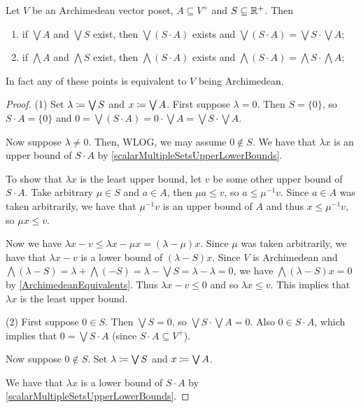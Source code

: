 \begin{lemma} \label{extremaScalarProduct}
Let $V$ be an Archimedean vector poset, $A\subseteq V^+$ and $S\subseteq \mathbb{R}^+$. Then
\begin{enumerate}
\item if $\bigvee A$ and $\bigvee S$ exist, then $\bigvee(S\cdot A)$ exists and $\bigvee(S\cdot A) = \bigvee S\cdot \bigvee A$;
\item if $\bigwedge A$ and $\bigwedge S$ exist, then $\bigwedge(S\cdot A)$ exists and $\bigwedge(S\cdot A) = \bigwedge S\cdot \bigwedge A$;
\end{enumerate}
\end{lemma}
In fact any of these points is equivalent to $V$ being Archimedean.
\begin{proof}
(1) Set $\lambda \coloneqq \bigvee S$ and $x \coloneqq \bigvee A$. First suppose $\lambda = 0$. Then $S = \{0\}$, so $S\cdot A = \{0\}$ and $0 = \bigvee(S\cdot A) = 0\cdot \bigvee A = \bigvee S \cdot \bigvee A$.

Now suppose $\lambda \neq 0$. Then, WLOG, we may assume $0\notin S$. We have that $\lambda x$ is an upper bound of $S\cdot A$ by \ref{scalarMultipleSetsUpperLowerBounds}.

To show that $\lambda x$ is the least upper bound, let $v$ be some other upper bound of $S\cdot A$. Take arbitrary $\mu\in S$ and $a\in A$, then $\mu a \leq v$, so $a \leq \mu^{-1}v$. Since $a\in A$ was taken arbitrarily, we have that $\mu^{-1}v$ is an upper bound of $A$ and thus $x \leq \mu^{-1}v$, so $\mu x\leq v$.

Now we have $\lambda x - v \leq \lambda x - \mu x = (\lambda - \mu) x$. Since $\mu$ was taken arbitrarily, we have that $\lambda x - v$ is a lower bound of $(\lambda - S)x$. Since $V$ is Archimedean and $\bigwedge (\lambda - S) = \lambda + \bigwedge (-S) = \lambda - \bigvee S = \lambda - \lambda = 0$, we have $\bigwedge (\lambda - S)x = 0$ by \ref{ArchimedeanEquivalents}. Thus $\lambda x - v \leq 0$ and so $\lambda x \leq v$. This implies that $\lambda x$ is the least upper bound.

(2) First suppose $0\in S$. Then $\bigvee S = 0$, so $\bigvee S \cdot \bigvee A = 0$. Also $0\in S\cdot A$, which implies that $0 = \bigvee S\cdot A$ (since $S\cdot A \subseteq V^+$).

Now suppose $0\notin S$. Set $\lambda \coloneqq \bigvee S$ and $x\coloneqq \bigvee A$.

We have that $\lambda x$ is a lower bound of $S\cdot A$ by \ref{scalarMultipleSetsUpperLowerBounds}.


\end{proof}
